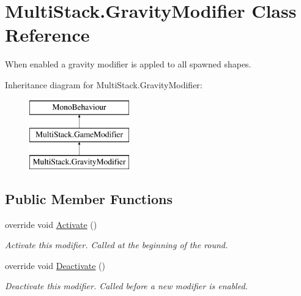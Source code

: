 \hypertarget{class_multi_stack_1_1_gravity_modifier}{}\section{Multi\+Stack.\+Gravity\+Modifier Class Reference}
\label{class_multi_stack_1_1_gravity_modifier}


When enabled a gravity modifier is appled to all spawned shapes.  


Inheritance diagram for Multi\+Stack.\+Gravity\+Modifier\+:\begin{figure}[H]
\begin{center}
\leavevmode
\includegraphics[height=3.000000cm]{class_multi_stack_1_1_gravity_modifier}
\end{center}
\end{figure}
\subsection*{Public Member Functions}
\begin{DoxyCompactItemize}
\item 
override void \hyperlink{class_multi_stack_1_1_gravity_modifier_a752251d8ba8759184857968d2be3327b}{Activate} ()
\begin{DoxyCompactList}\small\item\em Activate this modifier. Called at the beginning of the round. \end{DoxyCompactList}\item 
override void \hyperlink{class_multi_stack_1_1_gravity_modifier_a709194d36407f2910ceff941785d8720}{Deactivate} ()
\begin{DoxyCompactList}\small\item\em Deactivate this modifier. Called before a new modifier is enabled. \end{DoxyCompactList}\end{DoxyCompactItemize}
